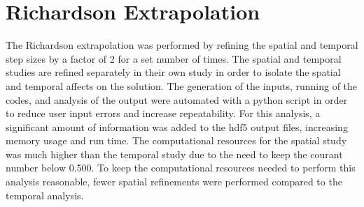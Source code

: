 \documentclass{mc2015}
\begin{document}
%    
%    
%    
%    
%    

\section{Richardson Extrapolation}

The Richardson extrapolation was performed by refining the spatial and temporal
step sizes by a factor of 2 for a set number of times. The spatial and temporal
studies are refined separately in their own study in order to isolate the
spatial and temporal affects on the solution. The generation of the inputs,
running of the codes, and analysis of the output were automated with a python
script in order to reduce user input errors and increase repeatability.  For
this analysis, a significant amount of information was added to the hdf5 output
files, increasing memory usage and run time. The computational resources for the
spatial study was much higher than the temporal study due to the need to keep
the courant number below 0.500. To keep the computational resources needed
to perform this analysis reasonable, fewer spatial refinements were performed
compared to the temporal analysis.
\end{document}
